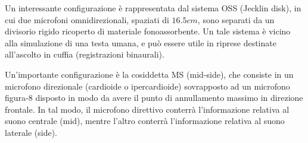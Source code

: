 Un interessante configurazione è rappresentata dal sistema OSS (Jecklin disk),
in cui due microfoni omnidirezionali, spaziati di $16.5cm$, sono separati da un
divisorio rigido ricoperto di materiale fonoassorbente. Un tale sistema è vicino
alla simulazione di una testa umana, e può essere utile in riprese destinate
all’ascolto in cuffia (registrazioni binaurali).

Un’importante configurazione è la cosiddetta MS (mid-side), che consiste in un
microfono direzionale (cardioide o ipercardioide) sovrapposto ad un microfono
figura-8 disposto in modo da avere il punto di annullamento massimo in direzione
frontale. In tal modo, il microfono direttivo conterrà l’informazione relativa
al suono centrale (mid), mentre l’altro conterrà l’informazione relativa al
suono laterale (side).


